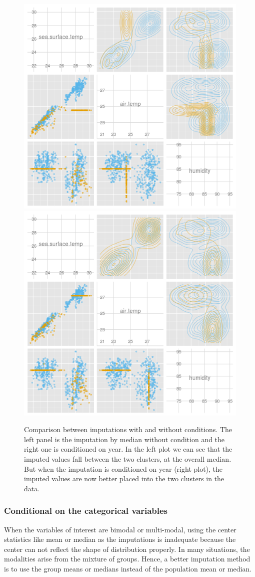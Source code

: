\documentclass[article]{jss}
\begin{document}
\begin{center}
\begin{figure}[h]
\begin{centering}
\includegraphics[width=.48\textwidth]{graph/fig4-1-median-uncondition}
\includegraphics[width=.48\textwidth]{graph/fig4-2-median-condition}
\par\end{centering}
\caption{Comparison between imputations with and without conditions. The left panel is the imputation by median without condition and the right one is conditioned on year. In the left plot we can see that the imputed values fall between the two clusters, at the overall median. But when the imputation is conditioned on year (right plot), the imputed values are now better placed into the two clusters in the data.}
\label{fig: condition}
\end{figure}
\par\end{center}

\subsubsection{Conditional on the categorical variables}

When the variables of interest are bimodal or multi-modal, using the center statistics like mean or median as the imputations is inadequate because the center can not reflect the shape of distribution properly. In many situations, the modalities arise from the mixture of groups. Hence, a better imputation method is to use the group means or medians instead of the population mean or median.
\end{document}
